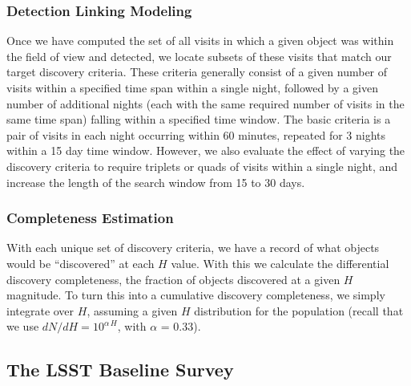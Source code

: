 \subsubsection{Detection Linking Modeling}

Once we have computed the set of all visits in which a given object was within the field of view and detected, we locate subsets of these visits that match our target discovery criteria. These criteria generally consist of a given number of visits within a specified
time span within a single night, followed by a given number of additional nights (each with the same required number
of visits in the same time span) falling within a specified time window. The basic criteria is a pair of visits in each
night occurring within 60 minutes, repeated for 3 nights within a 15 day time window. However, we also evaluate
the effect of varying the discovery criteria to require triplets or quads of visits within a single night, and increase
the length of the search window from 15 to 30 days. 

\subsubsection{Completeness Estimation}

With each unique set of discovery criteria, we have a record of what objects would be ``discovered'' at each $H$ value.
With this we calculate the differential discovery completeness, the fraction of objects discovered at a given $H$ magnitude.
To turn this into a cumulative discovery completeness, we simply integrate over $H$, assuming a given $H$ distribution
for the population (recall that we use $dN/dH = 10^{\alpha\, H}$, with $\alpha$ = 0.33).


\subsection{The LSST Baseline Survey\label{sec:surveys}}

